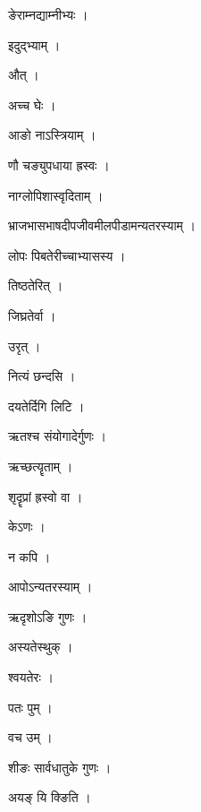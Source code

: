 \documentclass[10pt, openany]{book}
\begin{document}
\noindent ङेराम्नद्याम्नीभ्यः ।

\noindent इदुद्भ्याम् ।

\noindent औत् ।

\noindent अच्च घेः ।

\noindent आङो नाऽस्त्रियाम् ।

\noindent णौ चङ्युपधाया ह्रस्वः ।

\noindent नाग्लोपिशास्वृदिताम् ।

\noindent भ्राजभासभाषदीपजीवमीलपीडामन्यतरस्याम् ।

\noindent लोपः पिबतेरीच्चाभ्यासस्य ।

\noindent तिष्ठतेरित् ।

\noindent जिघ्रतेर्वा ।

\noindent उरृत् ।

\noindent नित्यं छन्दसि ।

\noindent दयतेर्दिगि लिटि ।

\noindent ऋतश्च संयोगादेर्गुणः ।

\noindent ऋच्छत्यॄताम् ।

\noindent श‍ृदॄप्रां ह्रस्वो वा ।

\noindent केऽणः ।

\noindent न कपि ।

\noindent आपोऽन्यतरस्याम् ।

\noindent ऋदृशोऽङि गुणः ।

\noindent अस्यतेस्थुक् ।

\noindent श्वयतेरः ।

\noindent पतः पुम् ।

\noindent वच उम् ।

\noindent शीङः सार्वधातुके गुणः ।

\noindent अयङ् यि क्ङिति ।
\end{document}
